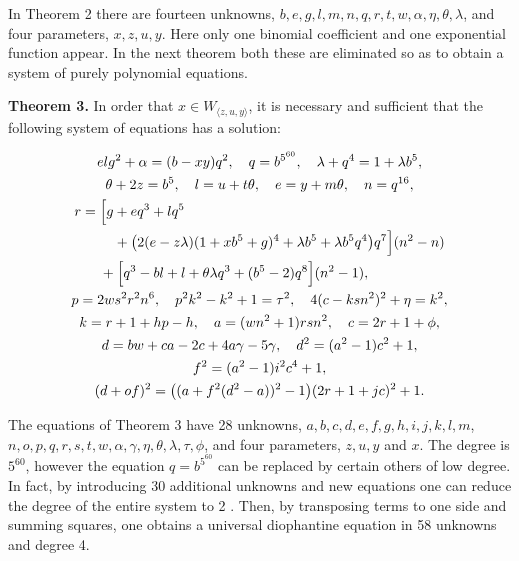 \documentclass[11pt,a4paper]{article}
\begin{document}
In Theorem 2 there are fourteen unknowns, $b,\allowbreak  e,\allowbreak  g,\allowbreak  l,\allowbreak  m,\allowbreak  n,\allowbreak  q,\allowbreak  r,\allowbreak  t,\allowbreak  w,\allowbreak  \alpha,\allowbreak  \eta,\allowbreak  \theta,\allowbreak  \lambda$, and four parameters, $x,\allowbreak  z,\allowbreak  u,\allowbreak  y$. Here only one binomial coefficient and one exponential function appear. In the next theorem both these are eliminated so as to obtain a system of purely polynomial equations.

\noindent\textbf{Theorem 3.} In order that $x \in W_{\langle z, u, y\rangle}$, it is necessary and sufficient that the following system of equations has a solution:

\[
\begin{gathered}
 e l g^{2}+\alpha=(b-xy)q^{2},\quad q=b^{5^{60}},\quad
 \lambda+q^{4}=1+\lambda b^{5},\\
 \theta+2z=b^{5},\quad l=u+t\theta,\quad e=y+m\theta,\quad n=q^{16},\\
\begin{aligned}
r={}&\Bigl[g+e q^{3}+l q^{5}\\
 &\quad+\bigl(2(e-z\lambda)(1+xb^{5}+g)^{4}
       +\lambda b^{5}+\lambda b^{5}q^{4}\bigr)q^{7}\Bigr](n^{2}-n)\\
 &+\Bigl[q^{3}-bl+l+\theta\lambda q^{3}+(b^{5}-2)q^{8}\Bigr](n^{2}-1),
\end{aligned}\\
 p=2ws^{2}r^{2}n^{6},\quad p^{2}k^{2}-k^{2}+1=\tau^{2},\quad
 4(c-ksn^{2})^{2}+\eta=k^{2},\\
 k=r+1+hp-h,\quad a=(wn^{2}+1)rsn^{2},\quad c=2r+1+\phi,\\
 d=bw+ca-2c+4a\gamma-5\gamma,\quad d^{2}=(a^{2}-1)c^{2}+1,\\
 f^{2}=(a^{2}-1)i^{2}c^{4}+1,\\
 (d+of)^{2}=\bigl((a+f^{2}(d^{2}-a))^{2}-1\bigr)(2r+1+jc)^{2}+1.
\end{gathered}
\]

The equations of Theorem 3 have 28 unknowns, $a,\allowbreak  b,\allowbreak  c,\allowbreak  d,\allowbreak  e,\allowbreak  f,\allowbreak  g,\allowbreak  h,\allowbreak  i,\allowbreak  j,\allowbreak  k,\allowbreak  l,\allowbreak  m$, $n,\allowbreak  o,\allowbreak  p,\allowbreak  q,\allowbreak  r,\allowbreak  s,\allowbreak  t,\allowbreak  w,\allowbreak  \alpha,\allowbreak  \gamma,\allowbreak  \eta,\allowbreak  \theta,\allowbreak  \lambda,\allowbreak  \tau,\allowbreak  \phi$, and four parameters, $z,\allowbreak  u,\allowbreak  y$ and $x$. The degree is $5^{60}$, however the equation $q=b^{5^{60}}$ can be replaced by certain others of low degree. In fact, by introducing 30 additional unknowns and new equations one can reduce the degree of the entire system to 2 . Then, by transposing terms to one side and summing squares, one obtains a universal diophantine equation in 58 unknowns and degree 4.
\end{document}
